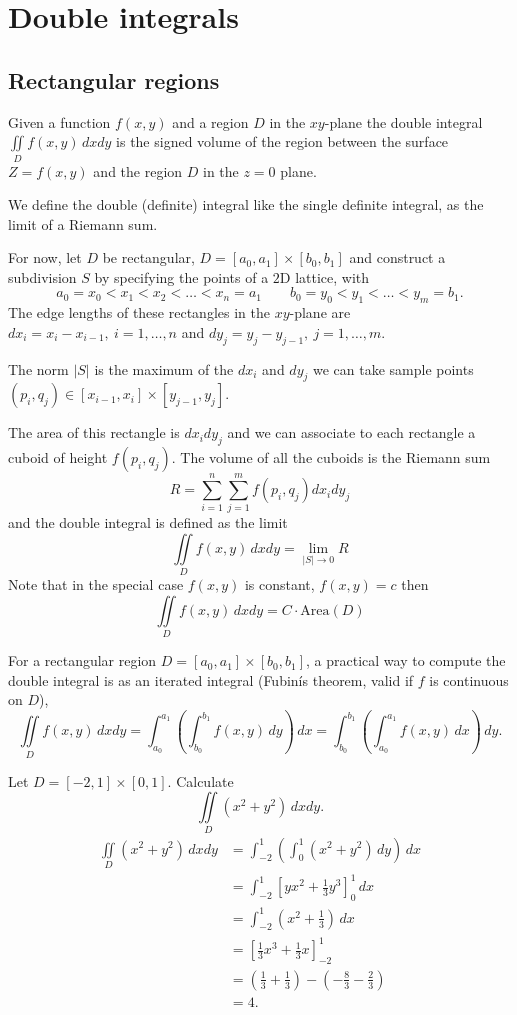 \documentclass[10pt, a4paper]{article}
\begin{document}
\newpage

\section{Double integrals}

\subsection{Rectangular regions}
Given a function $f(x, y)$ and a region $D$ in the $xy$-plane the double integral $\iint\limits_Df(x, y)\,dxdy$ is the signed volume of the region between the surface $Z = f(x, y)$ and the region $D$ in the $z = 0$ plane.

We define the double (definite) integral like the single definite integral,
as the limit of a Riemann sum.

For now,
let $D$ be rectangular,
$D = [a_0, a_1] \times [b_0, b_1]$
and construct a subdivision $S$ by specifying the points of a $2$D lattice,
with
\[
a_0 = x_0 < x_1 < x_2 < \dotsc < x_n = a_1\qquad b_0 = y_0 < y_1 < \dotsc < y_m = b_1.
\]
The edge lengths of these rectangles in the $xy$-plane are $dx_i = x_i - x_{i - 1},\ i = 1, \dotsc, n$ and $dy_j = y_j - y_{j - 1},\ j = 1, \dotsc, m$.

The norm $|S|$ is the maximum of the $dx_i$ and $dy_j$ we can take sample points $(p_i, q_j) \in [x_{i - 1}, x_i] \times [y_{j - 1}, y_j]$.

The area of this rectangle is $dx_idy_j$ and we can associate to each rectangle a cuboid of height $f(p_i, q_j)$.
The volume of all the cuboids is the Riemann sum
\[
R = \sum_{i = 1}^n\sum_{j = 1}^mf(p_i, q_j)dx_idy_j
\]
and the double integral is defined as the limit
\[
\iint\limits_D f(x, y)\,dxdy = \lim_{|S| \rightarrow 0}R
\]
Note that in the special case $f(x, y)$ is constant,
$f(x, y) = c$ then
\[
\iint\limits_Df(x, y)\,dxdy = C \cdot \mathrm{Area}(D)
\]

For a rectangular region $D = [a_0, a_1] \times [b_0, b_1]$,
a practical way to compute the double integral is as an iterated integral
(Fubinís theorem, valid if $f$ is continuous on $D$),
\[
\iint\limits_{D}f(x, y)\,dxdy = \int_{a_0}^{a_1}\left(\int_{b_0}^{b_1}f(x, y)\,dy\right)\,dx = \int_{b_0}^{b_1}\left(\int_{a_0}^{a_1}f(x, y)\,dx\right)\,dy.
\]
\begin{example}
    Let $D = [-2, 1] \times [0, 1]$.
    Calculate
    \[
    \iint\limits_D(x ^ 2 + y ^ 2)\,dxdy.
    \]
    \begin{align*}
        \iint\limits_D(x ^ 2 + y ^ 2)\,dxdy &= \int_{-2}^{1}\left(\int_0^1(x ^ 2 + y ^ 2)\,dy\right)\,dx \\
        &= \int_{-2}^{1}\left[yx ^ 2 + \frac{1}{3}y ^ 3\right]^1_0\,dx \\
        &= \int_{-2}^{1}\left(x ^ 2 + \frac{1}{3}\right)\,dx \\
        &= \left[\frac{1}{3}x ^ 3 + \frac{1}{3}x\right]_{-2}^1 \\
        &= \left(\frac{1}{3} + \frac{1}{3}\right) - \left(-\frac{8}{3} - \frac{2}{3}\right) \\
        &= 4.
    \end{align*}
\end{example}
\end{document}
